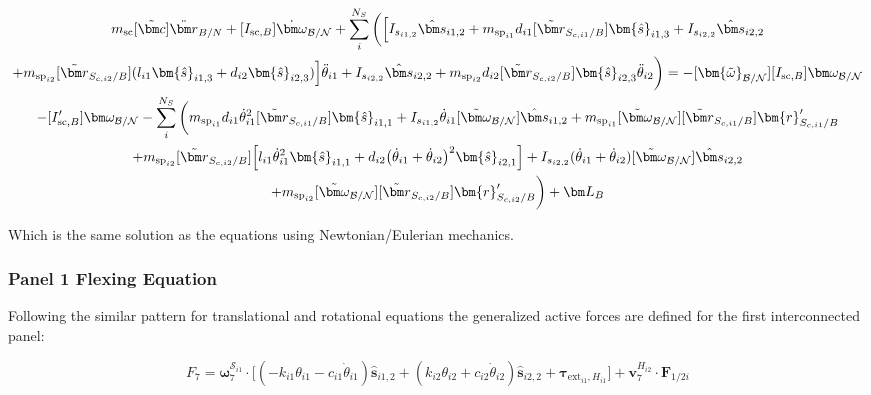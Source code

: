 \begin{multline}
	m_{\text{sc}} [\tilde{\bm c}] \ddot{\bm r}_{B/N} +[I_{\text{sc},B}] \dot{\bm\omega}_{\cal B/N} + \sum\limits_{i}^{N_S}\bigg(\Big[I_{s_{i1,2}} \hat{\bm s}_{i1,2}+
	m_{\text{sp}_{i1}} d_{i1}  [\tilde{{\bm r}}_{S_{c,i1}/B}] \bm{\hat{s}}_{i1,3} +I_{s_{i2,2}} \hat{\bm s}_{i2,2} \\
	+ m_{\text{sp}_{i2}} [\tilde{{\bm r}}_{S_{c,i2}/B}] (l_{i1} \bm{\hat{s}}_{i1,3} + d_{i2} \bm{\hat{s}}_{i2,3}) \Big] \ddot{\theta}_{i1}
	+I_{s_{i2,2}}\hat{\bm s}_{i2,2} + m_{\text{sp}_{i2}} d_{i2} [\tilde{{\bm r}}_{S_{c,i2}/B}] \bm{\hat{s}}_{i2,3} \ddot{\theta}_{i2} \bigg)=  -[\bm{\tilde{\omega}}_{\cal B/N}] [I_{\text{sc},B}] \bm\omega_{\cal B/N} \\
	- [I'_{\text{sc},B}] \bm\omega_{\cal B/N}
	- \sum\limits_{i}^{N_S}\bigg(
	m_{\text{sp}_{i1}} d_{i1} \dot{\theta}_{i1}^2 [\tilde{{\bm r}}_{S_{c,i1}/B}]   \bm{\hat{s}}_{i1,1}
	+I_{s_{i1,2}} \dot{\theta}_{i1} [\tilde{\bm \omega}_{\cal{B/N}}] \hat{\bm s}_{i1,2} + m_{\text{sp}_{i1}} [\tilde{\bm\omega}_{\cal B/N}] [\tilde{{\bm r}}_{S_{c,i1}/B}] \bm{r}'_{S_{c,i1}/B}
	\\
	+ m_{\text{sp}_{i2}} [\tilde{{\bm r}}_{S_{c,i2}/B}] \Big[ l_{i1} \dot{\theta}_{i1}^2 \bm{\hat{s}}_{i1,1} + d_{i2}\big(\dot{\theta}_{i1} + \dot{\theta}_{i2}\big)^2\bm{\hat{s}}_{i2,1}\Big]
	+I_{s_{i2,2}}  (\dot{\theta}_{i1}  + \dot{\theta}_{i2}) [\tilde{\bm \omega}_{\cal{B/N}}] \hat{\bm s}_{i2,2} \\
	+ m_{\text{sp}_{i2}} [\tilde{\bm\omega}_{\cal B/N}] [\tilde{{\bm r}}_{S_{c,i2}/B}] \bm{r}'_{S_{c,i2}/B} \bigg) + \bm L_B
\end{multline}

Which is the same solution as the equations using Newtonian/Eulerian mechanics.

\subsubsection{Panel 1 Flexing Equation}
Following the similar pattern for translational and rotational equations the generalized active forces are defined for the first interconnected panel:

\begin{equation}
	F_{7} = \bm \omega_{7}^{\mathcal{S}_{i1}} \cdot \Big[ (-k_{i1} \theta_{i1} - c_{i1} \dot{\theta}_{i1})\bm{\hat{s}}_{i1,2} + (k_{i2} \theta_{i2} + c_{i2} \dot{\theta}_{i2})\bm{\hat{s}}_{i2,2} + \bm \tau_{\text{ext}_{i1},H_{i1}} \Big] + \bm v^{H_{i2}}_{7} \cdot \bm F_{1/2i}
\end{equation}


